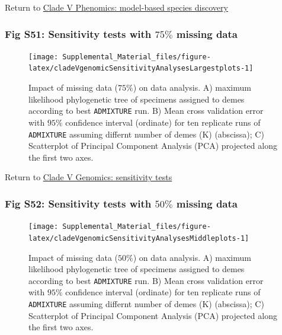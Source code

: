 \documentclass[
  11pt,
]{article}
\begin{document}
Return to \protect\hyperlink{model-based-species-discovery-8}{Clade V Phenomics: model-based species discovery}
\pagebreak

\hypertarget{fig-s51-sensitivity-tests-with-75-missing-data}{%
\subsubsection{\texorpdfstring{Fig S51: Sensitivity tests with \(75\%\) missing data}{Fig S51: Sensitivity tests with 75\textbackslash\% missing data}}\label{fig-s51-sensitivity-tests-with-75-missing-data}}

\begin{figure}
\texttt{[image: Supplemental\_Material\_files/figure-latex/cladeVgenomicSensitivityAnalysesLargestplots-1]} \caption{Impact of missing data ($75\%$) on data analysis. A) maximum likelihood phylogenetic tree of specimens assigned to demes according to best \texttt{ADMIXTURE} run. B) Mean cross validation error with $95\%$ confidence interval (ordinate) for ten replicate runs of \texttt{ADMIXTURE} assuming differnt number of demes (K) (abscissa); C) Scatterplot of Principal Component Analysis (PCA) projected along the first two axes.}\label{fig:cladeVgenomicSensitivityAnalysesLargestplots}
\end{figure}

Return to \protect\hyperlink{sensitivity-tests-4}{Clade V Genomics: sensitivity tests}
\pagebreak

\hypertarget{fig-s52-sensitivity-tests-with-50-missing-data}{%
\subsubsection{\texorpdfstring{Fig S52: Sensitivity tests with \(50\%\) missing data}{Fig S52: Sensitivity tests with 50\textbackslash\% missing data}}\label{fig-s52-sensitivity-tests-with-50-missing-data}}

\begin{figure}
\texttt{[image: Supplemental\_Material\_files/figure-latex/cladeVgenomicSensitivityAnalysesMiddleplots-1]} \caption{Impact of missing data ($50\%$) on data analysis. A) maximum likelihood phylogenetic tree of specimens assigned to demes according to best \texttt{ADMIXTURE} run. B) Mean cross validation error with $95\%$ confidence interval (ordinate) for ten replicate runs of \texttt{ADMIXTURE} assuming differnt number of demes (K) (abscissa); C) Scatterplot of Principal Component Analysis (PCA) projected along the first two axes.}\label{fig:cladeVgenomicSensitivityAnalysesMiddleplots}
\end{figure}
\end{document}
